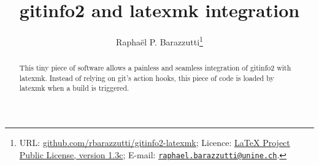 \documentclass[A4]{ltxdoc}
\begin{document}
\thispagestyle{plain}
\title{gitinfo2 and latexmk integration}
\renewcommand{\gitMark}{
Release:\gitReln{}: \gitAbbrevHash{} (\gitAuthorDate)}
\author{%
  Raphaël P. Barazzutti\thanks{%
    URL: \href{https://github.com/rbarazzutti/gitinfo2-latexmk}{github.com/rbarazzutti/gitinfo2-latexmk};
    Licence: \href{http://latex-project.org/lppl/lppl-1-3c.txt}{LaTeX Project Public License, version 1.3c};
    E-mail: \href{mailto:raphael.barazzutti@unine.ch}{\tt raphael.barazzutti@unine.ch}.}}

\maketitle
\thispagestyle{plain}
\begin{abstract}
    This tiny piece of software allows a painless and seamless integration of \textsf{gitinfo2} with \textsf{latexmk}. Instead of relying on \textsf{git}'s action hooks, this piece of code is loaded
    by \textsf{latexmk} when a build is triggered.
\end{abstract}

\end{document}
